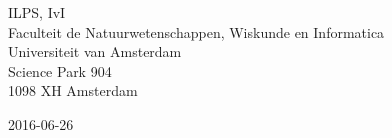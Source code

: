 \begin{center}
\vspace{0.25cm}

ILPS, IvI\\
Faculteit de Natuurwetenschappen, Wiskunde en Informatica\\
Universiteit van Amsterdam\\
Science Park 904\\
1098 XH  Amsterdam

\vspace{1.5cm}

2016-06-26

\end{center}
